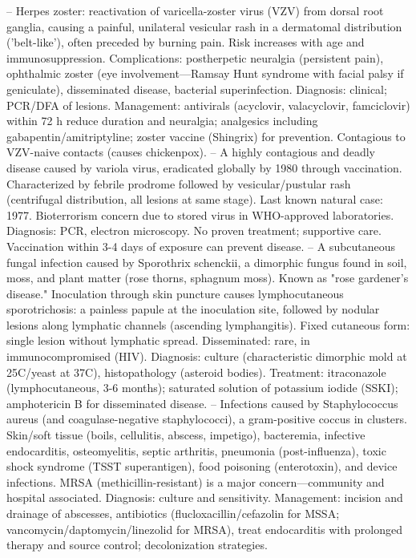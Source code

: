 -- Herpes zoster: reactivation of varicella-zoster virus (VZV) from dorsal root ganglia, causing a painful, unilateral vesicular rash in a dermatomal distribution ('belt-like'), often preceded by burning pain. Risk increases with age and immunosuppression. Complications: postherpetic neuralgia (persistent pain), ophthalmic zoster (eye involvement—Ramsay Hunt syndrome with facial palsy if geniculate), disseminated disease, bacterial superinfection. Diagnosis: clinical; PCR/DFA of lesions. Management: antivirals (acyclovir, valacyclovir, famciclovir) within 72 h reduce duration and neuralgia; analgesics including gabapentin/amitriptyline; zoster vaccine (Shingrix) for prevention. Contagious to VZV-naive contacts (causes chickenpox).
-- A highly contagious and deadly disease caused by variola virus, eradicated globally by 1980 through vaccination. Characterized by febrile prodrome followed by vesicular/pustular rash (centrifugal distribution, all lesions at same stage). Last known natural case: 1977. Bioterrorism concern due to stored virus in WHO-approved laboratories. Diagnosis: PCR, electron microscopy. No proven treatment; supportive care. Vaccination within 3-4 days of exposure can prevent disease.
-- A subcutaneous fungal infection caused by Sporothrix schenckii, a dimorphic fungus found in soil, moss, and plant matter (rose thorns, sphagnum moss). Known as "rose gardener's disease." Inoculation through skin puncture causes lymphocutaneous sporotrichosis: a painless papule at the inoculation site, followed by nodular lesions along lymphatic channels (ascending lymphangitis). Fixed cutaneous form: single lesion without lymphatic spread. Disseminated: rare, in immunocompromised (HIV). Diagnosis: culture (characteristic dimorphic mold at 25C/yeast at 37C), histopathology (asteroid bodies). Treatment: itraconazole (lymphocutaneous, 3-6 months); saturated solution of potassium iodide (SSKI); amphotericin B for disseminated disease.
-- Infections caused by Staphylococcus aureus (and coagulase-negative staphylococci), a gram-positive coccus in clusters. Skin/soft tissue (boils, cellulitis, abscess, impetigo), bacteremia, infective endocarditis, osteomyelitis, septic arthritis, pneumonia (post-influenza), toxic shock syndrome (TSST superantigen), food poisoning (enterotoxin), and device infections. MRSA (methicillin-resistant) is a major concern—community and hospital associated. Diagnosis: culture and sensitivity. Management: incision and drainage of abscesses, antibiotics (flucloxacillin/cefazolin for MSSA; vancomycin/daptomycin/linezolid for MRSA), treat endocarditis with prolonged therapy and source control; decolonization strategies.
